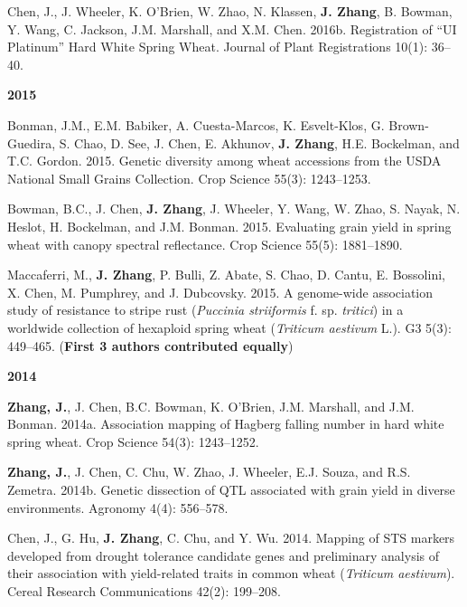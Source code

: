 \begin{cventries}
{\begin{cvitems}
	\item {Chen, J., J. Wheeler, K. O’Brien, W. Zhao, N. Klassen, \textbf{J. Zhang}, B. Bowman, Y. Wang, C. Jackson, J.M. Marshall, and X.M. Chen. 2016b. Registration of “UI Platinum” Hard White Spring Wheat. Journal of Plant Registrations 10(1): 36–40.}
\end{cvitems}
}
\cventry
{\textbf{2015}}
{}
{}
{}
{
\begin{cvitems}
\setlength\itemsep{0.5em}
	\item {Bonman, J.M., E.M. Babiker, A. Cuesta-Marcos, K. Esvelt-Klos, G. Brown-Guedira, S. Chao, D. See, J. Chen, E. Akhunov, \textbf{J. Zhang}, H.E. Bockelman, and T.C. Gordon. 2015. Genetic diversity among wheat accessions from the USDA National Small Grains Collection. Crop Science 55(3): 1243–1253.}
	\item {Bowman, B.C., J. Chen, \textbf{J. Zhang}, J. Wheeler, Y. Wang, W. Zhao, S. Nayak, N. Heslot, H. Bockelman, and J.M. Bonman. 2015. Evaluating grain yield in spring wheat with canopy spectral reflectance. Crop Science 55(5): 1881–1890.}
	\item {Maccaferri, M., \textbf{J. Zhang}, P. Bulli, Z. Abate, S. Chao, D. Cantu, E. Bossolini, X. Chen, M. Pumphrey, and J. Dubcovsky. 2015. A genome-wide association study of resistance to stripe rust (\emph{Puccinia striiformis} f. sp. \emph{tritici}) in a worldwide collection of hexaploid spring wheat (\emph{Triticum aestivum} L.). G3 5(3): 449–465. (\textbf{First 3 authors contributed equally})}
\end{cvitems}
}
\cventry
{\textbf{2014}}
{}
{}
{}
{
\begin{cvitems}
\setlength\itemsep{0.5em}
	\item {\textbf{Zhang, J.}, J. Chen, B.C. Bowman, K. O’Brien, J.M. Marshall, and J.M. Bonman. 2014a. Association mapping of Hagberg falling number in hard white spring wheat. Crop Science 54(3): 1243–1252.}
	\item {\textbf{Zhang, J.}, J. Chen, C. Chu, W. Zhao, J. Wheeler, E.J. Souza, and R.S. Zemetra. 2014b. Genetic dissection of QTL associated with grain yield in diverse environments. Agronomy 4(4): 556–578.}
	\item {Chen, J., G. Hu, \textbf{J. Zhang}, C. Chu, and Y. Wu. 2014. Mapping of STS markers developed from drought tolerance candidate genes and preliminary analysis of their association with yield-related traits in common wheat (\emph{Triticum aestivum}). Cereal Research Communications 42(2): 199–208.}

\end{cvitems}}
\end{cventries}
